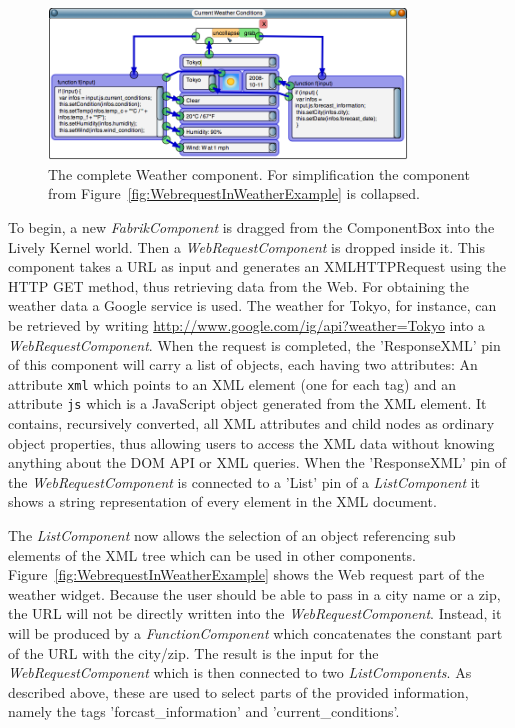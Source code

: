 \documentclass[pdftex, times, 10pt, twocolumn]{article}
\begin{document}
\begin{figure}[]\centering
\includegraphics[width=0.850000\textwidth]{weatherExample07.png} 

\caption{The complete Weather component. For simplification the component from Figure~\ref{fig:WebrequestInWeatherExample} is collapsed. }
\label{fig:ExapandedSimplifiedWeatherExample}
\end{figure}
To begin, a new {\em FabrikComponent} is dragged from the ComponentBox into the Lively Kernel world. Then a {\em WebRequestComponent} is dropped inside it. This component takes a URL as input and generates an XMLHTTPRequest using the HTTP GET method, thus retrieving data from the Web. For obtaining the weather data a Google service is used. The weather for Tokyo, for instance, can be retrieved by writing \url{http://www.google.com/ig/api?weather=Tokyo} into a {\em WebRequestComponent}. When the request is completed, the 'ResponseXML' pin of this component will carry a list of objects, each having two attributes: An attribute {\tt xml} which  points to an XML element (one for each tag) and an attribute {\tt js} which is a JavaScript object generated from the XML element. It contains, recursively converted, all XML attributes and child nodes as ordinary object properties, thus allowing users to access the XML data without knowing anything about the DOM API or XML queries. When the 'ResponseXML' pin of the {\em WebRequestComponent} is connected to a 'List' pin of a {\em ListComponent} it shows a string representation of every element in the XML document. 

The {\em ListComponent} now allows the selection of an object referencing sub elements of the XML tree which can be used in other components. Figure~\ref{fig:WebrequestInWeatherExample} shows the Web request part of the weather widget. Because the user should be able to pass in a city name or a zip, the URL will not be directly written into the {\em WebRequestComponent}. Instead, it will be produced by a {\em FunctionComponent} which concatenates the constant part of the URL with the city/zip. The result is the input for the {\em WebRequestComponent} which is then connected to two {\em ListComponents}. As described above, these are used to select parts of the provided information, namely the tags 'forcast\_information' and 'current\_conditions'. 
\end{document}
